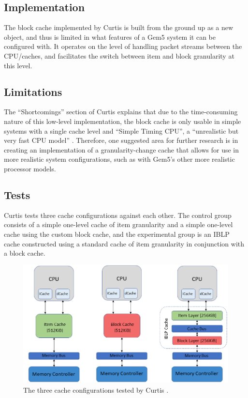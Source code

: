 \documentclass[12pt,twoside]{reedthesis}
\begin{document}
	\subsection*{Implementation}

	The block cache implemented by Curtis is built from the ground up as a new object, and thus is limited in what features of a Gem5 system it can be configured with. It operates on the level of handling packet streams between the CPU/caches, and facilitates the switch between item and block granularity at this level.

	\subsection*{Limitations}

	The ``Shortcomings'' section of Curtis explains that due to the time-consuming nature of this low-level implementation, the block cache is only usable in simple systems with a single cache level and ``Simple Timing CPU'', a ``unrealistic but very fast CPU model'' \cite{curtis}. Therefore, one suggested area for further research is in creating an implementation of a granularity-change cache that allows for use in more realistic system configurations, such as with Gem5's other more realistic processor models.

	\subsection*{Tests}

	Curtis tests three cache configurations against each other. The control group consists of a simple one-level cache of item granularity and a simple one-level cache using the custom block cache, and the experimental group is an IBLP cache constructed using a standard cache of item granularity in conjunction with a block cache.
	
	\begin{figure}[H]
		\centering
		\includegraphics[width=5in]{figures/curtis_caches.png}
		\caption{The three cache configurations tested by Curtis \cite{curtis}.}
	\end{figure}
\end{document}
